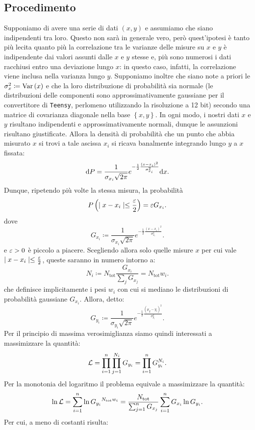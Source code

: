\documentclass{article}[a4paper, oneside, 11pt]
\begin{document}
\subsection{Procedimento}
Supponiamo di avere una serie di dati $(x, y)$ e assumiamo che siano
indipendenti tra loro. Questo non sarà in generale vero, però quest'ipotesi
è tanto più lecita quanto più la correlazione tra le varianze delle misure su
$x$ e $y$ è indipendente dai valori assunti dalle $x$ e $y$ stesse e, più
sono numerosi i dati racchiusi entro una deviazione lungo $x$: in questo caso,
infatti, la correlazione viene inclusa nella varianza lungo $y$.
Supponiamo inoltre che siano note a priori le $\sigma_x ^2 \coloneqq \text{Var}\left(x\right)$
e che la loro distribuzione di probabilità sia normale (le distribuzioni
delle componenti sono approssimativamente gaussiane per il convertitore
di \verb+Teensy+, perlomeno utilizzando la risoluzione a 12 bit) secondo una 
matrice
di covarianza diagonale nella base $\left\{x, y\right\}$.
In ogni modo, i nostri dati $x$ e $y$ risultano indipendenti e
approssimativamente normali, dunque le assunzioni risultano giustificate. 
Allora la densità di probabilità che un punto che abbia misurato $x$ si trovi
a tale ascissa $x_i$ si ricava banalmente integrando lungo $y$ a $x$ fissata:
\[
	\mathrm{d} P = \frac{1}{\sigma_{x_i} \sqrt{2\pi}}
	e^{-\frac{1}{2}{\frac{(x - x_i)^2}{\sigma_{x_i}^2}}} \mathrm{d} x
.\] 
Dunque, ripetendo più volte la stessa misura, la probabilità
\[
	P\left(\mid x - x_i \mid \leq \frac{\varepsilon}{2} \right) = \varepsilon G_{x_i} 
.\]
dove \[
	G_{x_i} \coloneqq \frac{1}{\sigma_{x_i} \sqrt{2\pi}}
	e^{-\frac{1}{2}{\frac{(x - x_i)^2}{\sigma_{x_i}^2}}}
.\] 
e $\varepsilon > 0$ è piccolo a piacere. Scegliendo allora solo quelle misure $x$ per
cui vale $\mid x - x_i \mid \leq \frac{\varepsilon}{2}$, queste saranno in numero
intorno a:
\[
	N_i \coloneqq N_{\text{tot}} \frac{G_{x_i}}{\sum_j G_{x_j}} =
		N_{\text{tot}} w_i
.\] 
che definisce implicitamente i pesi $w_i$ con cui si mediano le distribuzioni
di probabilità gaussiane $G_{x_i}$.
Allora, detto:
\[
	G_{y_i} \coloneqq \frac{1}{\sigma_{y_i} \sqrt{2\pi}}
	e^{-\frac{1}{2}{\frac{(\mu_y - y_i)^2}{\sigma_{y_i}^2}}}
.\] 
Per il principio di massima verosimiglianza siamo quindi interessati a
massimizzare la quantità:
\[
	\mathcal L = \prod_{i=1}^{n} \prod_{j=1}^{N_i} G_{y_i} = 
	\prod_{i=1}^{n} G_{y_i}^{N_i}
.\] 
Per la monotonia del logaritmo il problema equivale a massimizzare la quantità:
\[
	\ln{\mathcal L} = \sum_{i=1}^{n}\ln{G_{y_i}}^{N_{\text{tot}}w_i} = 
	\frac{N_{\text{tot}}} {\sum_{j=1}^{n} G_{x_j}} 
	\sum_{i=1}^{n} G_{x_i} \ln{G_{y_i}}
.\] 
Per cui, a meno di costanti risulta:
\end{document}
